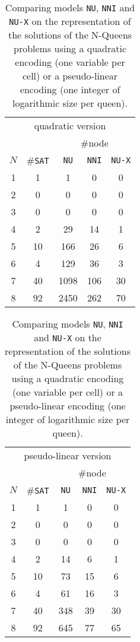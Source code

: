 \documentclass[a4paper,10pt]{article}
\begin{document}
\begin{table}[h]
\center
\begin{tabular}{|c | c | c | c | c |}
\multicolumn{5}{|c|}{quadratic version} \\
& & \multicolumn{3}{|c|}{\#node} \\
$N$ & \#\texttt{SAT} & \texttt{NU} & \texttt{NNI} & \texttt{NU-X} \\ \hline
1   & 1              & 1           & 0            & 0             \\
2   & 0              & 0           & 0            & 0             \\
3   & 0              & 0           & 0            & 0             \\
4   & 2              & 29          & 14           & 1             \\
5   & 10             & 166         & 26           & 6             \\
6   & 4              & 129         & 36           & 3             \\
7   & 40             & 1098        & 106          & 30            \\
8   & 92             & 2450        & 262          & 70            \\
\end{tabular}
\begin{tabular}{|c | c | c | c | c |}
\multicolumn{5}{|c|}{pseudo-linear version} \\
& & \multicolumn{3}{|c|}{\#node} \\
$N$ & \#\texttt{SAT} & \texttt{NU} & \texttt{NNI} & \texttt{NU-X} \\ \hline
1   & 1              & 1           & 0            & 0       \\
2   & 0              & 0           & 0            & 0       \\
3   & 0              & 0           & 0            & 0       \\
4   & 2              & 14          & 6            & 1       \\
5   & 10             & 73          & 15           & 6       \\
6   & 4              & 61          & 16           & 3       \\
7   & 40             & 348         & 39           & 30      \\
8   & 92             & 645         & 77           & 65      \\
\end{tabular}
\caption{Comparing models \texttt{NU}, \texttt{NNI} and \texttt{NU-X} on the representation of the solutions of the N-Queens problems using a quadratic encoding (one variable per cell) or a pseudo-linear encoding (one integer of logarithmic size per queen).}
\label{table-nqueens}
\end{table}
\end{document}
